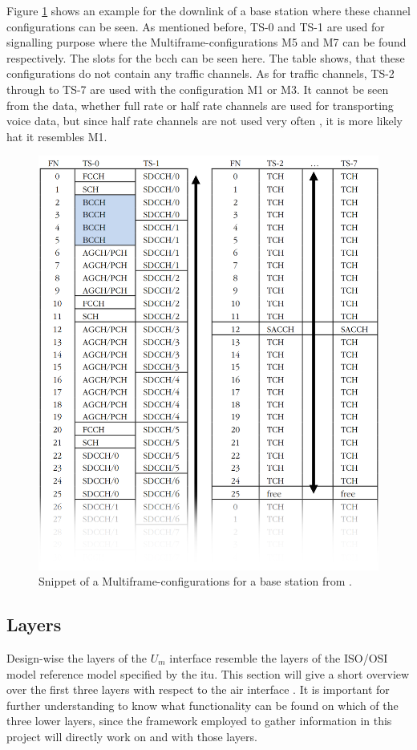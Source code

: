 Figure \ref{fig:channel_example} shows an example \cite{kommsys2006} for the downlink of a base station where these channel configurations can be seen.
As mentioned before, TS-0 and TS-1 are used for signalling purpose where the Multiframe-configurations M5 and M7 can be found respectively.
The slots for the \gls{bcch} can be seen here.
The table shows, that these configurations do not contain any traffic channels.
As for traffic channels, TS-2 through to TS-7 are used with the configuration M1 or M3.
It cannot be seen from the data, whether full rate or half rate channels are used for transporting voice data, but since half rate channels are not used very often \cite{protocols1999}, it is more likely hat it resembles M1.
\begin{figure}
	\centering
	\includegraphics[width=.9\textwidth]{../Images/channel_example}
	\caption{Snippet of a Multiframe-configurations for a base station from \cite{kommsys2006}.}
	\label{fig:channel_example}
\end{figure}

\subsection{Layers}
\label{sec:layers}
Design-wise the layers of the $U_m$ interface resemble the layers of the ISO/OSI model reference model specified by the \gls{itu}.
This section will give a short overview over the first three layers with respect to the air interface \cite{protocols1999}.
It is important for further understanding to know what functionality can be found on which of the three lower layers, since the framework employed to gather information in this project will directly work on and with those layers.

